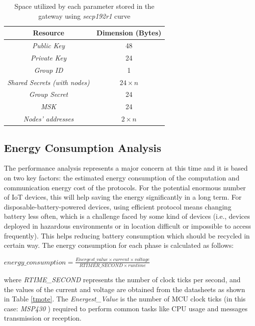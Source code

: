 \begin{table}[H]
\caption{Space utilized by each parameter stored in the gateway using \textit{secp192r1} curve }
\label{resourcesGateway}
\begin{center}
\begin{tabular}{|c|c|}
\hline
 \textbf{Resource} & \textbf{Dimension (Bytes)}\\
\hline
\textit{Public Key} & 48\\
\hline
\textit{Private Key} & 24\\
\hline
\textit{Group ID} & 1\\
\hline
\textit{Shared Secrets (with nodes)} & $24 \times n$\\
\hline
\textit{Group Secret}  & 24\\
\hline
\textit{MSK} & 24\\
\hline
 \textit{Nodes'  addresses} & $2 \times n$\\
\hline
\end{tabular}
\end{center}
\end{table}


\subsection{Energy Consumption Analysis}
The performance analysis represents a major concern at this time and it is based on two key factors: the estimated energy consumption of the computation and communication energy cost of the protocols.
For the potential enormous number of IoT devices, this will help saving the energy significantly in a long term. 
For disposable-battery-powered devices, using efficient protocol means changing battery less often, which is a challenge faced by some kind of devices (i.e., devices deployed in hazardous environments or in location difficult or impossible to access frequently). 
This helps reducing battery consumption which should be recycled in certain way.
The energy consumption for each phase is calculated as follows:
\begin{center}
    $energy\_consumption=\frac{Energest\_value \times current \times voltage}{RTIMER\_SECOND \times runtime}$
\end{center}

where \textit{RTIME\_SECOND} represents the number of clock ticks per second, and the values of the current and voltage are obtained from the datasheets as shown in Table \ref{tmote}.
The \textit{Energest\_Value} is the number of  MCU clock ticks (in this case: \textit{MSP430} ) required to perform common tasks like CPU usage and messages transmission or reception. 

